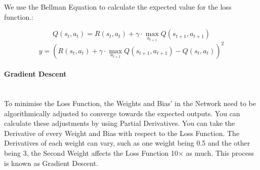 \begin{flushleft}
                    We use the Bellman Equation to calculate the expected value for the loss function.: \\
                    \vspace{0.2cm}

                    \[Q(s_t, a_t) = R(s_t, a_t) + \gamma \cdot \max_{a_{t+1}} Q(s_{t+1}, a_{t+1})\]
                    \[y = \left( R(s_t, a_t) + \gamma \cdot \max_{a_{t+1}} Q(s_{t+1}, a_{t+1}) - Q(s_t, a_t) \right)^2\]

                \paragraph{Gradient Descent} \mbox{} \\ 
                    \vspace{0.2cm}   
                    To minimise the Loss Function, the Weights and Bias' in the Network need to be algorithmically adjusted to converge towards the expected outputs. You can
                    calculate these adjustments by using Partial Derivatives. You can take the Derivative of every Weight and Bias with respect to the Loss Function. The Derivatives
                    of each weight can vary, such as one weight being 0.5 and the other being 3, the Second Weight affects the Loss Function 10$\times$ as much. This process is
                    known as Gradient Descent. \\


\end{flushleft}
